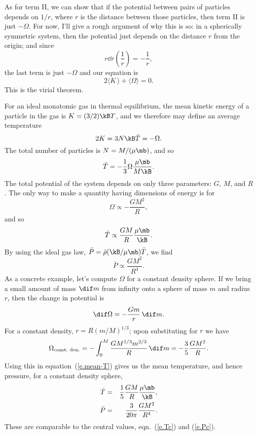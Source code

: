 As for term II, we can show that if the potential between pairs of particles depends on $1/r$, where $r$ is the distance between those particles, then term II is just $-\Omega$.  For now, I'll give a rough argument of why this is so:  in a spherically symmetric system, then the potential just depends on the distance $r$ from the origin; and since
\[
	r\dd{}{r} \left(\frac{1}{r}\right) = -\frac{1}{r},
\]
the last term is just $-\Omega$ and our equation is
\begin{equation}\label{e.virial-theorem}
2\langle K\,\rangle + \langle \Omega\rangle = 0.
\end{equation}
This is the virial theorem.

For an ideal monatomic gas in thermal equilibrium, the mean kinetic energy of a particle in the gas is $K = (3/2)\kB T$, and we therefore may define an average temperature
\begin{equation}\label{e.Tbar}
	2 K = 3 N\kB \bar{T} = -\Omega.
\end{equation}
The total number of particles is $N=M/(\mu\mb)$, and so
\begin{equation}\label{e.mean-T}
\bar{T} = -\frac{1}{3}\Omega\frac{\mu\mb}{M\kB}.
\end{equation}
The total potential of the system depends on only three parameters: $G$, $M$, and $R$.  The only way to make a quantity having dimensions of energy is for
\[ \Omega \propto -\frac{GM^{2}}{R}, \]
and so
\[ \bar{T} \propto \frac{GM}{R}\frac{\mu\mb}{\kB}.  \]
By using the ideal gas law, $\bar{P} = \bar{\rho}(\kB/\mu\mb)\bar{T}$, we find
\[ \bar{P} \propto \frac{GM^{2}}{R^{4}}. \]
As a concrete example, let's compute $\Omega$ for a constant density sphere.
If we bring a small amount of mass $\dif m$ from infinity onto a sphere of mass $m$ and radius $r$, then the change in potential is \[ \dif\Omega = -\frac{Gm}{r}\,\dif m. \]
For a constant density, $r = R(m/M)^{1/3}$; upon substituting for $r$ we have
\[
	\Omega_{\textrm{const.\ den.}} = - \int_{0}^{M}\frac{GM^{1/3} m^{2/3}}{R}\,\dif m = -\frac{3}{5}\frac{GM^{2}}{R}.
\]
Using this in equation~(\ref{e.mean-T}) gives us the mean temperature, and hence pressure, for a constant density sphere,
\begin{eqnarray}\label{e.mean-T-rho}
\bar{T} &=& \frac{1}{5}\frac{GM}{R}\frac{\mu\mb}{\kB},\\
\label{e.mean-P}
\bar{P} &=& \frac{3}{20\pi}\frac{GM^{2}}{R^{4}}.
\end{eqnarray}
These are comparable to the central values, eqn.~(\ref{e.Tc}) and (\ref{e.Pc}).

